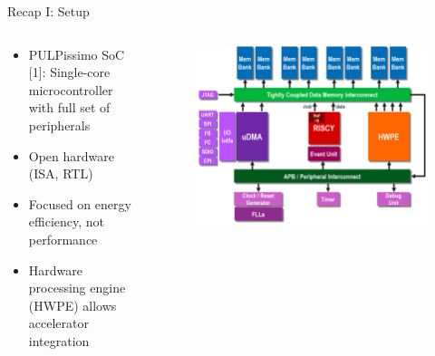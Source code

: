 \documentclass[aspectratio=169, nobackgroundmain]{beamer}
\begin{document}
\begin{frame}[fragile]{Recap I: Setup}
  \begin{columns}
      \begin{column}{0.5\textwidth}
          \begin{itemize}
              \item PULPissimo SoC [1]: Single-core microcontroller with full set of peripherals
              \item Open hardware (ISA, RTL)
              \item Focused on energy efficiency, not performance
              \item Hardware processing engine (HWPE) allows accelerator integration
          \end{itemize}
      \end{column}
      \begin{column}{0.49\textwidth}
          \begin{figure}
              \raggedleft
              \includegraphics[width=1\textwidth]{pulpissimo_arch.png}
          \end{figure}
      \end{column}
  \end{columns}
\end{frame}
\end{document}
